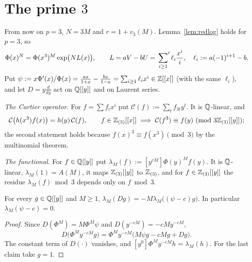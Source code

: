 \documentclass[11pt]{amsart}
\begin{document}
\section{The prime \texorpdfstring{$3$}{3}}\label{sec:p3}

From now on $p=3$, $N=3M$ and $r=1+v_3(M)$. Lemma~\ref{lem:redlog} holds for $p=3$, so
\begin{equation}\label{eq:phi3}
\Phi(x)^N=\Phi(x^3)^M\exp\bigl(NL(x)\bigr),\qquad L=aV-bU=\sideset{}{'}\sum_{i\ge1}\ell_i\frac{x^i}i,\quad \ell_i:=a(-1)^{i+1}-b.
\end{equation}
Put $\psi:=x\Phi'(x)/\Phi(x)=\frac{ax}{1+x}-\frac{bx}{1-x}=\sum_{i\ge1}\ell_ix^i\in\mathbb{Z}[[x]]$ (with the same $\ell_i$), and let $D=y\frac d{dy}$ act on $\mathbb{Q}[[y]]$ and on Laurent series.

\emph{The Cartier operator.} For $f=\sum f_ix^i$ put $\mathcal C(f):=\sum_tf_{3t}y^t$. It is $\mathbb{Q}$-linear, and
\begin{equation}\label{eq:cartier}
\mathcal C\bigl(h(x^3)f(x)\bigr)=h(y)\,\mathcal C(f),\qquad f\in\mathbb{Z}_{(3)}[[x]]\implies\mathcal C(f^3)\equiv f(y)\ (\mathrm{mod}\ 3\mathbb{Z}_{(3)}[[y]]);
\end{equation}
the second statement holds because $f(x)^3\equiv f(x^3)\pmod 3$ by the multinomial theorem.

\emph{The functional.} For $f\in\mathbb{Q}[[y]]$ put $\lambda_M(f):=[y^{cM}]\Phi(y)^Mf(y)$. It is $\mathbb{Q}$-linear, $\lambda_M(1)=A(M)$, it maps $\mathbb{Z}_{(3)}[[y]]$ to $\mathbb{Z}_{(3)}$, and for $f\in\mathbb{Z}_{(3)}[[y]]$ the residue $\lambda_M(f)\bmod 3$ depends only on $f\bmod3$.

\begin{lemma}\label{lem:exact}
For every $g\in\mathbb{Q}[[y]]$ and $M\ge1$, $\lambda_M(Dg)=-M\lambda_M\bigl((\psi-c)g\bigr)$. In particular $\lambda_M(\psi-c)=0$.
\end{lemma}
\begin{proof}
Since $D(\Phi^M)=M\Phi^M\psi$ and $D(y^{-cM})=-cMy^{-cM}$,
\[ D\bigl(\Phi^My^{-cM}g\bigr)=\Phi^My^{-cM}\bigl(M\psi g-cMg+Dg\bigr). \]
The constant term of $D(\cdot)$ vanishes, and $[y^0]\Phi^My^{-cM}h=\lambda_M(h)$. For the last claim take $g=1$.
\end{proof}
\end{document}
